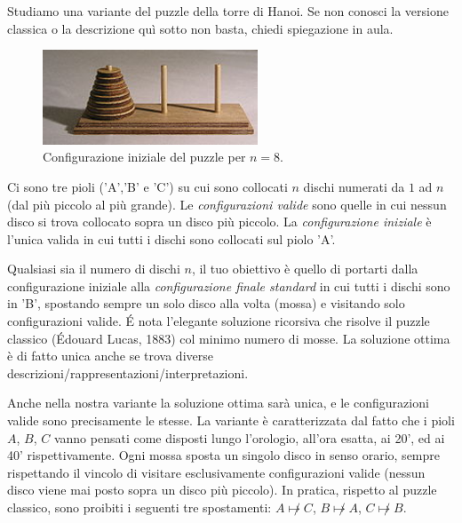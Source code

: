 \renewcommand{\nomebreve}{hanoi\_clockwise}
\renewcommand{\titolo}{The Hanoi puzzle with only clockwise moves}

\introduzione{}

Studiamo una variante del puzzle della torre di Hanoi. Se non conosci la versione classica o la descrizione quì sotto non basta, chiedi spiegazione in aula.

\begin{figure}[h!]
\begin{center}
  \noindent \includegraphics[width=0.57\textwidth]{figures/220px-Tower_of_Hanoi.jpeg}
\end{center}
\caption{Configurazione iniziale del puzzle per $n=8$.}
\end{figure}

Ci sono tre pioli ('A','B' e 'C') su cui sono collocati $n$ dischi numerati da $1$ ad $n$ (dal più piccolo al più grande). Le \emph{configurazioni valide} sono quelle in cui nessun disco si trova collocato sopra un disco più piccolo.
La \emph{configurazione iniziale} è l'unica valida in cui tutti i dischi sono collocati sul piolo 'A'.


Qualsiasi sia il numero di dischi $n$, il tuo obiettivo è quello di portarti dalla configurazione iniziale alla \emph{configurazione finale standard} in cui tutti i dischi sono in 'B', spostando sempre un solo disco alla volta (mossa) e visitando solo configurazioni valide.
\'E nota l'elegante soluzione ricorsiva che risolve il puzzle classico (Édouard Lucas, 1883) col minimo numero di mosse. La soluzione ottima è di fatto unica anche se trova diverse descrizioni/rappresentazioni/interpretazioni.

Anche nella nostra variante la soluzione ottima sarà unica, e le configurazioni valide sono precisamente le stesse. La variante è caratterizzata dal fatto che i pioli $A$, $B$, $C$ vanno pensati come disposti lungo l'orologio, all'ora esatta, ai 20', ed ai 40' rispettivamente.
Ogni mossa sposta un singolo disco in senso orario, sempre rispettando il vincolo di visitare esclusivamente configurazioni valide (nessun disco viene mai posto sopra un disco più piccolo). In pratica, rispetto al puzzle classico, sono proibiti i seguenti tre spostamenti: $A\not \mapsto C$, $B\not \mapsto A$, $C\not \mapsto B$.\\

